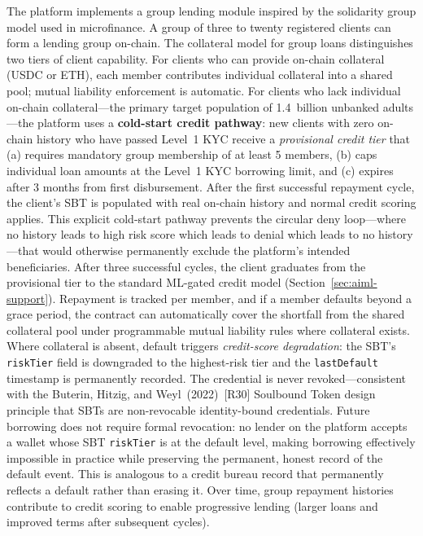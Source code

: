 \documentclass[12pt,a4paper]{report}
\begin{document}
The platform implements a group lending module inspired by the solidarity group model used in microfinance. A group of three to twenty registered clients can form a lending group on-chain. The collateral model for group loans distinguishes two tiers of client capability. For clients who can provide on-chain collateral (USDC or ETH), each member contributes individual collateral into a shared pool; mutual liability enforcement is automatic. For clients who lack individual on-chain collateral---the primary target population of 1.4~billion unbanked adults---the platform uses a \textbf{cold-start credit pathway}: new clients with zero on-chain history who have passed Level~1 KYC receive a \textit{provisional credit tier} that (a) requires mandatory group membership of at least 5 members, (b) caps individual loan amounts at the Level~1 KYC borrowing limit, and (c) expires after 3 months from first disbursement. After the first successful repayment cycle, the client's SBT is populated with real on-chain history and normal credit scoring applies. This explicit cold-start pathway prevents the circular deny loop---where no history leads to high risk score which leads to denial which leads to no history---that would otherwise permanently exclude the platform's intended beneficiaries. After three successful cycles, the client graduates from the provisional tier to the standard ML-gated credit model (Section~\ref{sec:aiml-support}). Repayment is tracked per member, and if a member defaults beyond a grace period, the contract can automatically cover the shortfall from the shared collateral pool under programmable mutual liability rules where collateral exists. Where collateral is absent, default triggers \textit{credit-score degradation}: the SBT's \texttt{riskTier} field is downgraded to the highest-risk tier and the \texttt{lastDefault} timestamp is permanently recorded. The credential is never revoked---consistent with the Buterin, Hitzig, and Weyl~(2022)~[R30] Soulbound Token design principle that SBTs are non-revocable identity-bound credentials. Future borrowing does not require formal revocation: no lender on the platform accepts a wallet whose SBT \texttt{riskTier} is at the default level, making borrowing effectively impossible in practice while preserving the permanent, honest record of the default event. This is analogous to a credit bureau record that permanently reflects a default rather than erasing it. Over time, group repayment histories contribute to credit scoring to enable progressive lending (larger loans and improved terms after subsequent cycles).
\end{document}

